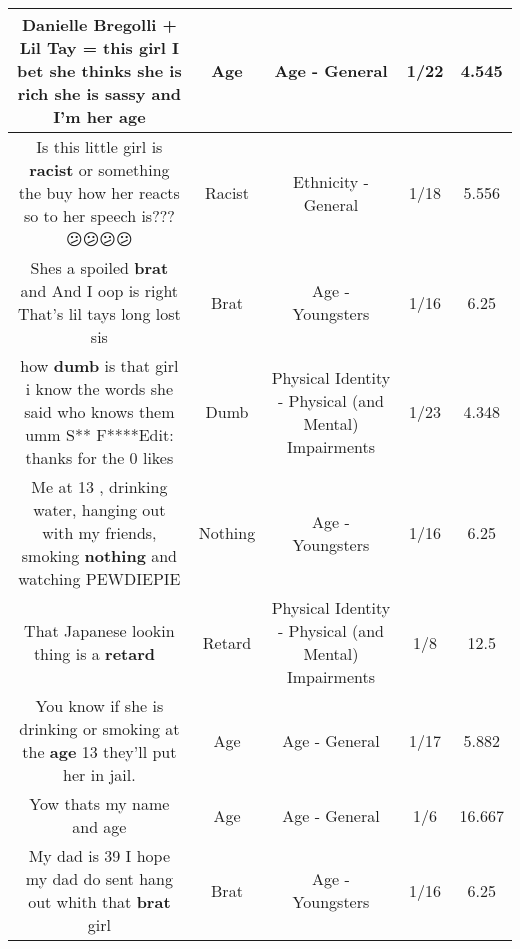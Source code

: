 \documentclass[11pt]{article}
\newlength\mylength
\begin{document}
\begin{center}
\begin{longtable}{|C{.65\mylength}|C{.30\mylength}|C{.12\mylength}|C{.12\mylength}|C{.12\mylength}|}
  \small Danielle Bregolli + Lil Tay = this girl I bet she thinks she is rich she is sassy and I'm her age\normalsize   & Age & Age - General & 1/22 & 4.545 \\  \hline
  \small Is this little girl is \textbf{racist} or something the buy how her reacts so to her speech is???😕😕😕😕\normalsize   & Racist & Ethnicity - General & 1/18 & 5.556 \\  \hline
  \small Shes a spoiled \textbf{brat} and And I oop is right That's lil tays long lost sis\normalsize   & Brat & Age - Youngsters & 1/16 & 6.25 \\  \hline
  \small how \textbf{dumb} is that girl i know the words she said who knows them umm S** F****Edit: thanks for the 0 likes\normalsize   & Dumb & Physical Identity - Physical (and Mental) Impairments & 1/23 & 4.348 \\  \hline
  \small Me at 13 , drinking water, hanging out with my friends, smoking \textbf{nothing} and watching PEWDIEPIE\normalsize   & Nothing & Age - Youngsters & 1/16 & 6.25 \\  \hline
  \small That Japanese lookin thing is a \textbf{retard} 🤣\normalsize   & Retard & Physical Identity - Physical (and Mental) Impairments & 1/8 & 12.5 \\  \hline
  \small You know if she is drinking or smoking at the \textbf{age} 13 they'll put her in jail.\normalsize   & Age & Age - General & 1/17 & 5.882 \\  \hline
  \small Yow thats my name and age\normalsize   & Age & Age - General & 1/6 & 16.667 \\  \hline
  \small My dad is 39 I hope my dad do sent hang out whith that \textbf{brat} girl\normalsize   & Brat & Age - Youngsters & 1/16 & 6.25 \\  \hline

\end{longtable}
\end{center}
\end{document}
